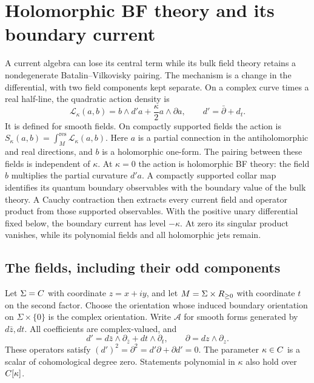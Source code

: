 \chapter{Holomorphic BF theory and its boundary current}
\label{chap:zero-level-bf}

A current algebra can lose its central term while its bulk field theory
retains a nondegenerate Batalin--Vilkovisky pairing.  The mechanism is a
change in the differential, with two field components kept separate.
On a complex curve times a real half-line, the quadratic action density is
\[
 \mathcal L_\kappa(a,b)
 =b\wedge d'a+\frac\kappa2a\wedge\partial a,
 \qquad d'=\bar\partial+d_t.
\]
It is defined for smooth fields.  On compactly supported fields the
action is $S_\kappa(a,b)=\int_M^{\mathrm{res}}\mathcal L_\kappa(a,b)$.
Here $a$ is a partial connection in the antiholomorphic and real
directions, and $b$ is a holomorphic one-form.  The pairing between
these fields is independent of $\kappa$.  At $\kappa=0$ the action is
holomorphic BF theory: the field $b$ multiplies the partial curvature
$d'a$.  A compactly supported collar map identifies its quantum
boundary observables with the boundary value of the bulk theory.
A Cauchy contraction then extracts every current field and operator
product from those supported observables.  With the positive unary
differential fixed below, the boundary current has level $-\kappa$.
At zero its singular product vanishes, while its polynomial fields
and all holomorphic jets remain.

\section{The fields, including their odd components}

Let $\Sigma=C$ with coordinate $z=x+iy$, and let
$M=\Sigma\times R_{\ge0}$ with coordinate $t$ on the second factor.
Choose the orientation whose induced boundary orientation on
$\Sigma\times\{0\}$ is the complex orientation.
Write $\mathcal A$ for smooth forms generated by $d\bar z,dt$.
All coefficients are complex-valued, and
\[
 d'=d\bar z\wedge\partial_{\bar z}+dt\wedge\partial_t,
 \qquad \partial=dz\wedge\partial_z.
\]
These operators satisfy $(d')^2=\partial^2=d'\partial+\partial d'=0$.
The parameter $\kappa\in C$ is a scalar of cohomological degree zero.
Statements polynomial in $\kappa$ also hold over $C[\kappa]$.

